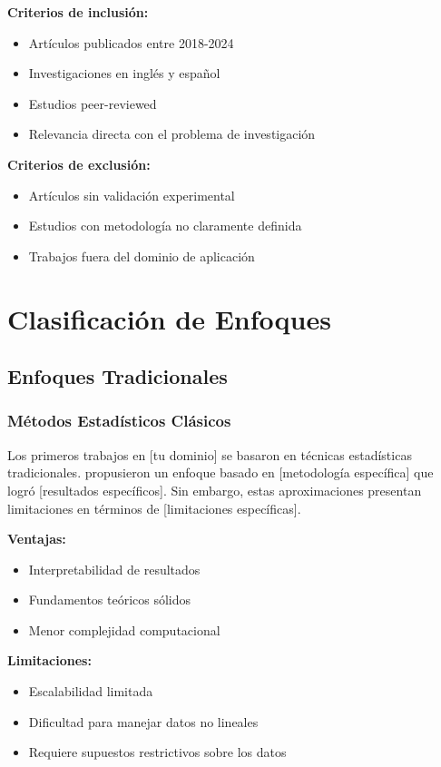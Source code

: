 \textbf{Criterios de inclusión:}
\begin{itemize}
    \item Artículos publicados entre 2018-2024
    \item Investigaciones en inglés y español
    \item Estudios peer-reviewed
    \item Relevancia directa con el problema de investigación
\end{itemize}

\textbf{Criterios de exclusión:}
\begin{itemize}
    \item Artículos sin validación experimental
    \item Estudios con metodología no claramente definida
    \item Trabajos fuera del dominio de aplicación
\end{itemize}

\section{Clasificación de Enfoques}

\subsection{Enfoques Tradicionales}

\subsubsection{Métodos Estadísticos Clásicos}

Los primeros trabajos en [tu dominio] se basaron en técnicas estadísticas tradicionales. \citet{autor2019} propusieron un enfoque basado en [metodología específica] que logró [resultados específicos]. Sin embargo, estas aproximaciones presentan limitaciones en términos de [limitaciones específicas].

\textbf{Ventajas:}
\begin{itemize}
    \item Interpretabilidad de resultados
    \item Fundamentos teóricos sólidos
    \item Menor complejidad computacional
\end{itemize}

\textbf{Limitaciones:}
\begin{itemize}
    \item Escalabilidad limitada
    \item Dificultad para manejar datos no lineales
    \item Requiere supuestos restrictivos sobre los datos
\end{itemize}

